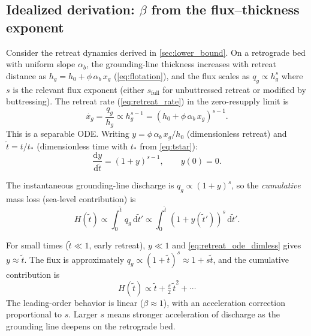 \documentclass[11pt]{article}
\newcommand{\dd}{\mathrm{d}}
\newcommand{\qg}{q_g}
\newcommand{\hg}{h_g}
\newcommand{\xg}{x_g}
\newcommand{\tdim}{\tilde{t}}
\begin{document}
\subsection{Idealized derivation: $\beta$ from the flux--thickness exponent}
\label{sec:beta_idealized}

Consider the retreat dynamics derived in \cref{sec:lower_bound}. On a retrograde bed with uniform slope $\alpha_b$, the grounding-line thickness increases with retreat distance as $\hg = h_0 + \phi\,\alpha_b\,\xg$ (\cref{eq:flotation}), and the flux scales as $\qg \propto \hg^{s}$ where $s$ is the relevant flux exponent (either $s_{\mathrm{full}}$ for unbuttressed retreat or modified by buttressing). The retreat rate (\cref{eq:retreat_rate}) in the zero-resupply limit is
\begin{equation}
	\dot{\xg} = \frac{\qg}{\hg} \propto \hg^{s-1} = (h_0 + \phi\,\alpha_b\,\xg)^{s-1}.
	\label{eq:retreat_rate_explicit}
\end{equation}
This is a separable ODE. Writing $y = \phi\,\alpha_b\,\xg / h_0$ (dimensionless retreat) and $\tdim = t/t_*$ (dimensionless time with $t_*$ from \cref{eq:tstar}):
\begin{equation}
	\frac{\dd y}{\dd\tdim} = (1 + y)^{s-1}, \qquad y(0) = 0.
	\label{eq:retreat_ode_dimless}
\end{equation}

The instantaneous grounding-line discharge is $\qg \propto (1 + y)^{s}$, so the \emph{cumulative} mass loss (sea-level contribution) is
\begin{equation}
	H(\tdim) \propto \int_0^{\tdim} \qg\,\dd\tdim' \propto \int_0^{\tdim} (1+y(\tdim'))^{s}\,\dd\tdim'.
	\label{eq:H_integral}
\end{equation}

For small times ($\tdim \ll 1$, early retreat), $y \ll 1$ and \cref{eq:retreat_ode_dimless} gives $y \approx \tdim$. The flux is approximately $\qg \propto (1 + \tdim)^s \approx 1 + s\tdim$, and the cumulative contribution is
\begin{equation}
	H(\tdim) \propto \tdim + \tfrac{s}{2}\,\tdim^2 + \cdots
	\label{eq:H_early}
\end{equation}
The leading-order behavior is linear ($\beta \approx 1$), with an acceleration correction proportional to $s$. Larger $s$ means stronger acceleration of discharge as the grounding line deepens on the retrograde bed.
\end{document}
